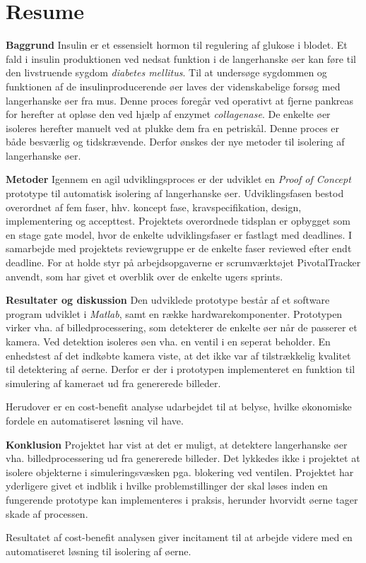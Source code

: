 \section*{Resume}
\textbf{Baggrund}
Insulin er et essensielt hormon til regulering af glukose i blodet. Et fald i insulin produktionen ved nedsat funktion i de langerhanske øer kan føre til den livstruende sygdom \textit{diabetes mellitus}. Til at undersøge sygdommen og funktionen af de insulinproducerende øer laves der videnskabelige forsøg med langerhanske øer fra mus. Denne proces foregår ved operativt at fjerne pankreas for herefter at opløse den ved hjælp af enzymet \textit{collagenase}. De enkelte øer isoleres herefter manuelt ved at plukke dem fra en petriskål. Denne proces er både besværlig og tidskrævende. Derfor ønskes der nye metoder til isolering af langerhanske øer.

\textbf{Metoder} Igennem en agil udviklingsproces er der udviklet en \textit{Proof of Concept} prototype til automatisk isolering af langerhanske øer. Udviklingsfasen bestod overordnet af fem faser, hhv. koncept fase, kravspecifikation, design, implementering og accepttest. Projektets overordnede tidsplan er opbygget som en stage gate model, hvor de enkelte udviklingsfaser er fastlagt med deadlines. I samarbejde med projektets reviewgruppe er de enkelte faser reviewed efter endt deadline. For at holde styr på arbejdsopgaverne er scrumværktøjet PivotalTracker anvendt, som har givet et overblik over de enkelte ugers sprints.

\textbf{Resultater og diskussion} Den udviklede prototype består af et software program udviklet i \textit{Matlab}, samt en række hardwarekomponenter. Prototypen virker vha. af billedprocessering, som detekterer de enkelte øer når de passerer et kamera. Ved detektion isoleres øen vha. en ventil i en seperat beholder. En enhedstest af det indkøbte kamera viste, at det ikke var af tilstrækkelig kvalitet til detektering af øerne. Derfor er der i prototypen implementeret en funktion til simulering af kameraet ud fra genererede billeder.
 
Herudover er en cost-benefit analyse udarbejdet til at belyse, hvilke økonomiske fordele en automatiseret løsning vil have.   


\textbf{Konklusion} Projektet har vist at det er muligt, at detektere langerhanske øer vha. billedprocessering ud fra genererede billeder. Det lykkedes ikke i projektet at isolere objekterne i simuleringsvæsken pga. blokering ved ventilen. Projektet har yderligere givet et indblik i hvilke problemstillinger der skal løses inden en fungerende prototype kan implementeres i praksis, herunder hvorvidt øerne tager skade af processen. 

Resultatet af cost-benefit analysen giver incitament til at arbejde videre med en automatiseret løsning til isolering af øerne. 




